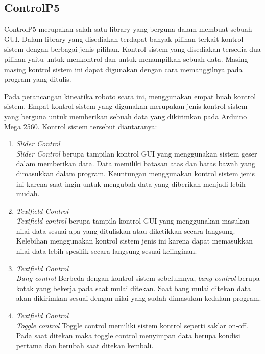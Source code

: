 \subsection{ControlP5}
ControlP5 merupakan salah satu library yang berguna dalam membuat sebuah GUI. Dalam library yang disediakan terdapat banyak pilihan terkait kontrol sistem dengan berbagai jenis pilihan. Kontrol sistem yang disediakan tersedia dua pilihan yaitu untuk menkontrol dan untuk menampilkan sebuah data. Masing-masing kontrol sistem ini dapat digunakan dengan cara memanggilnya pada program yang ditulis.

Pada perancangan kineatika roboto scara ini, menggunakan empat buah kontrol sistem. Empat kontrol sistem yang digunakan merupakan jenis kontrol sistem yang berguna untuk memberikan sebuah data yang dikirimkan pada Arduino Mega 2560. Kontrol sistem tersebut diantaranya:
\begin{enumerate}
	\item \textit{Slider Control} \\
	\textit{Slider Control} berupa tampilan kontrol GUI yang menggunakan sistem geser dalam memberikan data. Data memiliki batasan atas dan batas bawah yang dimasukkan dalam program. Keuntungan menggunakan kontrol sistem jenis ini karena saat ingin untuk mengubah data yang diberikan menjadi lebih mudah.


	\item \textit{Textfield Control} \\
\textit{Textfield control} berupa tampila kontrol GUI yang menggunakan masukan nilai data sesuai apa yang dituliskan atau diketikkan secara langsung. Kelebihan menggunakan kontrol sistem jenis ini karena dapat memasukkan nilai data lebih spesifik secara langsung sesuai keiinginan.
	
	\item \textit{Textfield Control} \\
\textit{Bang control}
Berbeda dengan kontrol sistem sebelumnya,\textit{ bang control }berupa kotak yang bekerja pada saat mulai ditekan. Saat bang mulai ditekan data akan dikirimkan sesuai dengan nilai yang sudah dimasukan kedalam program. 
	

	\item \textit{Textfield Control} \\
\textit{Toggle control}
Toggle control memiliki sistem kontrol seperti saklar on-off. Pada saat ditekan maka toggle control menyimpan data berupa kondisi pertama dan berubah saat ditekan kembali. 

\end{enumerate}
